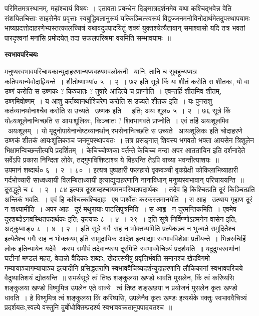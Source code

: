 \documentclass[11pt, openany]{book}
\begin{document}
परिमितमत्रस्थानम्, महांश्चायं विषयः~। एतावता प्रबन्धेन दिङ्मात्रदर्शनमेव यथा कश्चिद्भवेन्न वेति संशयितचित्ताः साहसेनैव प्रवृत्ताः स्वबुद्धिबलानुरूपं यत्किञ्चित्स्वरूपं विद्वज्जनमनोविनोदार्थमेतदुपस्थापयामः भाष्यप्रदत्तोदाहरणेभ्यस्तत्कालच्चित्रं यथावदुपपादयितुं शक्यं युक्तश्चेत्यैतावान् समाश्वासो यदि तत्र भवतां पारदृश्वनां मनांसि प्रमोदयेत् तदा सफलपरिश्रमा वयमिति सम्भावयामः~॥ 

\begin{center}
\textbf{\Large स्वभावपरिचयः \textendash\ }
\end{center}

मनुष्यस्वभावपरिचायकान्युदाहरणान्यप्यवश्यमवलोकनी \textendash\ यानि, तानि च सुबहून्यप्यत्र कतिपयान्येवोदाह्रियन्ते~। शीतोष्णाभ्यां० ५~। २~। ७२ इति सूत्रे {\qt किं यः शीतं करोति स शीतकः, यो वा उष्णं करोति स उष्णकः ? किञ्चातः ? तुषारे आदित्ये च प्राप्नोति~। एवन्तर्हि शीतमिव शीतम्, उष्णमिवोष्णम्~। य आशु कर्तव्यानर्थाश्चिरेण करोति स उच्यते शीतक इति~। यः पुनराशु कर्तव्यानर्थानाश्चैव करोति स उच्यते \textendash\ उष्णक इति~। इति; अयः शूल० ५~। २~। ७६ सूत्रे }किं योsयःशूलेनान्विच्छति स आयःशूलिकः, किञ्चातः ? शिवभागवते प्राप्नोति~। एवं तर्हि अयःशूलमिव \textendash\ अयःशूलम्~। यो मृदुनोपायेनान्वेष्टव्यानर्थान् रभसेनान्विच्छति स उच्यते \textendash\ आयःशूलिकः इति चोदाहरणे उष्णकं शीतकं आयःशूलिकञ्च जनमुपस्थापयतः~। तत्र प्रसङ्गात् शिवस्य भगवतो भक्ता आयसेन त्रिशूलेन भिक्षामन्विच्छन्तीत्यपि प्रदर्शितम्~। केचिच्चोष्णका वर्तन्ते केचिच्च मन्दा अपर आततायिन इति दर्शनादेते सर्वेऽपि प्रकारा निन्दिता लोके, तद्गुणविशिष्टाश्च ये विहरन्ति तेऽपि वाच्या भवन्तीत्याशयः~॥\\

उपमानं शब्दार्थ० ६~। २~। ८०~। इत्यत्र {\qt पुष्पहारी फलहारो वृकवञ्ची वृकप्रेक्षी कोकिलाभिव्याहारी गर्दभोच्चारी साध्वध्यायी विलम्बिताध्यायी} इत्याद्युदाहरणानि नानाविधान् मनुष्यस्वभावान् परिचाययन्ति~॥\\

दूराद्धूते च ८~। २~। ८४ इत्यत्र {\qt दूरशब्दश्चायमनवस्थितपदार्थकः}~। तदेव हि किश्चित्प्रति दूरं किञ्चित्प्रति अन्तिकं भवति.~। एवं हि कश्चित्कश्चिदाहृ \textendash\ एष पार्श्वेतः करकस्तमानयेति~। स आह \textendash\ उत्थाय गृहाण दूरं न शक्ष्यामीति~। अपर आह \textendash\ दूरं मथुरायाः पाटलिपुत्रमिति~। स आहृ \textendash\ न दूरमन्तिकमिति~। एवमेष दूरशब्दोऽनवस्थितपदार्थकः इति; कृत्यचः ८~। ४~। २९~। इति सूत्रे {\qt निर्विण्णोऽहमनेन वासेन} इति; अट्कुप्वाङ्० ८~। ४~। २~। इति सूत्रे {\qt गर्गैः सह न भोक्तव्यमिति प्रत्येकञ्च न भुज्यते समुदितैश्च इत्येतैश्च }गर्गैः सह न भोक्तव्यम् इति सामुदायिक आदेश इत्याद्याः स्वभावविशेष्राः प्रतीयन्ते~। भिन्नरुचिहिं लोक इतिन्यायेन यदेवै \textendash\ कस्य समीपं तदेवान्यस्य दूरमिति स्वभाववैचित्र्यं प्रदर्शयति~॥ {\qt यदुदुम्बरवर्णानां} घटीनां मण्डलं महत्, वेदान्नो वैदिकाः शब्दाः, खेदात्स्त्रीषु प्रवृत्तिर्भवति समानश्च खेदविगमो गम्यायाञ्चागम्यायाञ्च इत्यादीनि प्रसिद्धतराणि स्वभाववैचित्र्यदर्शन्युदाहरणानि लौकिकानां स्वभावपरिचये वैदुष्यातिशयं द्योतयन्ति~॥ समर्थसूत्रे {\qt त्वं तिष्ठ शङ्कुलया खण्डो धावति मुसलेन, किं त्वं करिष्यसि शङ्कुलया खण्डो विष्णुमित्र उपलेन} एते वाक्ये \textendash\ {\qt त्वं तिष्ठ शङ्खछया न प्रयोजनं मुसलेन कृतः खण्डो धावति~। हे विष्णुमित्र त्वं शङ्कुलया किं करिष्यसि, उपलेनैव कृतः खण्डः} इत्यर्थके वक्तुः स्वभाववैचित्र्यं प्रदर्शयतः,स्वल्पे वस्तुनि दुर्बोधोक्तिम्प्रदर्श्य स्वभाववक्रतामुपपादयतश्च~॥\\
\end{document}
